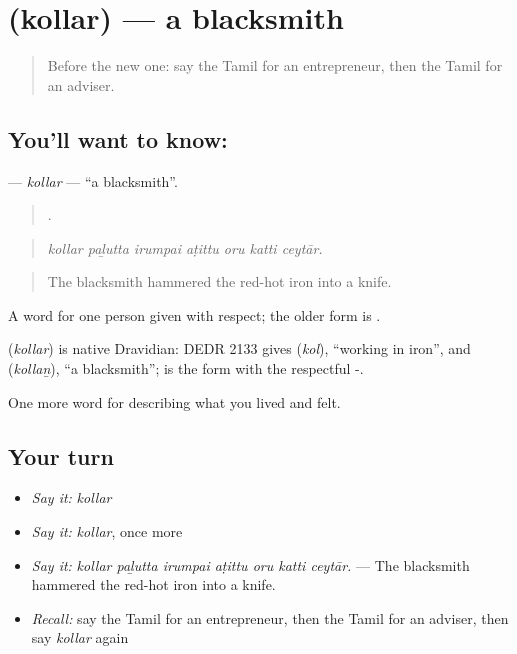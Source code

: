 \section[\texorpdfstring{\ta{கொல்லர்} (kollar)}{கொல்லர் (kollar)}]{ (kollar) — a blacksmith}

\label{lesson:TA-C513-kollar}



\begin{quote}
Before the new one: say the Tamil for an entrepreneur, then the Tamil for an adviser.
\end{quote}

\subsection*{You'll want to know: }
\textbf{} — \emph{kollar} — \textquotedblleft{}a blacksmith\textquotedblright{}.

\begin{quote}
      .
\end{quote}

\begin{quote}
\emph{kollar paḻutta irumpai aṭittu oru katti ceytār.}
\end{quote}

\begin{quote}
The blacksmith hammered the red-hot iron into a knife.
\end{quote}

A word for one person given with respect; the older form is .

\begin{cousinweb}
\textbf{} (\emph{kollar}) is native Dravidian: DEDR 2133 gives  (\emph{kol}), \textquotedblleft{}working in iron\textquotedblright{}, and  (\emph{kollaṉ}), \textquotedblleft{}a blacksmith\textquotedblright{};  is the form with the respectful -.
\end{cousinweb}

\begin{grammarlens}[title={What you've built}]
One more word for describing what you lived and felt.
\end{grammarlens}

\subsection*{Your turn}
\begin{itemize}
\raggedright
  \item \emph{Say it:} \emph{kollar}
  \item \emph{Say it:} \emph{kollar}, once more
  \item \emph{Say it:} \emph{kollar paḻutta irumpai aṭittu oru katti ceytār.} — The blacksmith hammered the red-hot iron into a knife.
  \item \emph{Recall:} say the Tamil for an entrepreneur, then the Tamil for an adviser, then say \emph{kollar} again
\end{itemize}

